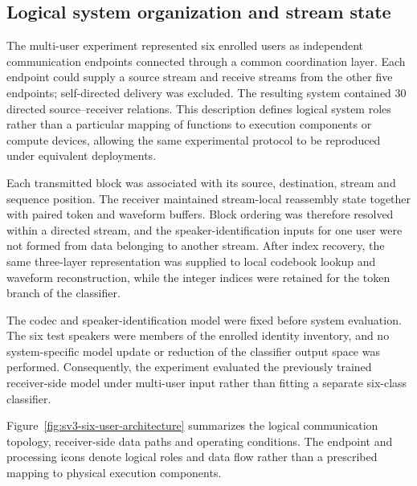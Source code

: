 \subsection{Logical system organization and stream state}
The multi-user experiment represented six enrolled users as independent communication endpoints connected through a common coordination layer. Each endpoint could supply a source stream and receive streams from the other five endpoints; self-directed delivery was excluded. The resulting system contained 30 directed source--receiver relations. This description defines logical system roles rather than a particular mapping of functions to execution components or compute devices, allowing the same experimental protocol to be reproduced under equivalent deployments.

Each transmitted block was associated with its source, destination, stream and sequence position. The receiver maintained stream-local reassembly state together with paired token and waveform buffers. Block ordering was therefore resolved within a directed stream, and the speaker-identification inputs for one user were not formed from data belonging to another stream. After index recovery, the same three-layer representation was supplied to local codebook lookup and waveform reconstruction, while the integer indices were retained for the token branch of the classifier.

The codec and speaker-identification model were fixed before system evaluation. The six test speakers were members of the enrolled identity inventory, and no system-specific model update or reduction of the classifier output space was performed. Consequently, the experiment evaluated the previously trained receiver-side model under multi-user input rather than fitting a separate six-class classifier.

Figure~\ref{fig:sv3-six-user-architecture} summarizes the logical communication topology, receiver-side data paths and operating conditions. The endpoint and processing icons denote logical roles and data flow rather than a prescribed mapping to physical execution components.

